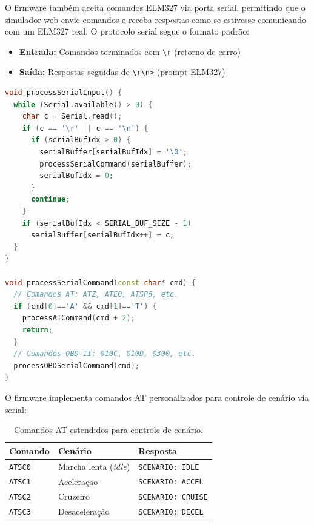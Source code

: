 O firmware também aceita comandos ELM327 via porta serial, permitindo que o simulador web envie comandos e receba respostas como se estivesse comunicando com um ELM327 real. O protocolo serial segue o formato padrão:

\begin{itemize}
    \item \textbf{Entrada:} Comandos terminados com \texttt{\textbackslash r} (retorno de carro)
    \item \textbf{Saída:} Respostas seguidas de \texttt{\textbackslash r\textbackslash n>} (prompt ELM327)
\end{itemize}

\begin{lstlisting}[language=C++, caption={Processamento de comandos serial ELM327.}, label={lst:arduino-serial}]
void processSerialInput() {
  while (Serial.available() > 0) {
    char c = Serial.read();
    if (c == '\r' || c == '\n') {
      if (serialBufIdx > 0) {
        serialBuffer[serialBufIdx] = '\0';
        processSerialCommand(serialBuffer);
        serialBufIdx = 0;
      }
      continue;
    }
    if (serialBufIdx < SERIAL_BUF_SIZE - 1)
      serialBuffer[serialBufIdx++] = c;
  }
}

void processSerialCommand(const char* cmd) {
  // Comandos AT: ATZ, ATE0, ATSP6, etc.
  if (cmd[0]=='A' && cmd[1]=='T') {
    processATCommand(cmd + 2);
    return;
  }
  // Comandos OBD-II: 010C, 010D, 0300, etc.
  processOBDSerialCommand(cmd);
}
\end{lstlisting}

O firmware implementa comandos AT personalizados para controle de cenário via serial:

\begin{table}[H]
\centering
\caption{Comandos AT estendidos para controle de cenário.}
\label{tab:at-cenario}
\begin{tabular}{@{}lll@{}}
\toprule
\textbf{Comando} & \textbf{Cenário} & \textbf{Resposta} \\
\midrule
\texttt{ATSC0} & Marcha lenta (\textit{idle}) & \texttt{SCENARIO: IDLE} \\
\texttt{ATSC1} & Aceleração & \texttt{SCENARIO: ACCEL} \\
\texttt{ATSC2} & Cruzeiro & \texttt{SCENARIO: CRUISE} \\
\texttt{ATSC3} & Desaceleração & \texttt{SCENARIO: DECEL} \\
\bottomrule
\end{tabular}
\end{table}

